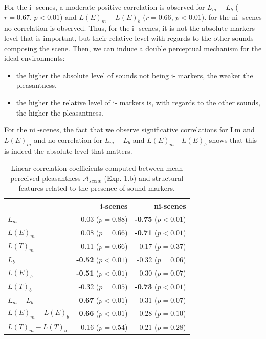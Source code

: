 \documentclass[twoside,twocolumn]{article}
\begin{document}
For the i- scenes, a moderate positive correlation is observed for $L_m-L_b$ ($r=0.67$, $p<0.01$) and $L(E)_m-L(E)_b$ ($r=0.66$, $p<0.01$). for the ni- scenes no correlation is observed. Thus, for the i- scenes, it is not the absolute markers level that is important, but their relative level with regards to the other sounds composing the scene. Then, we can induce a double perceptual mechanism for the ideal environments:

\begin{itemize}
\item the higher the absolute level of sounds not being i- markers, the weaker the pleasantness,
\item the higher the relative level of i- markers is, with regards to the other sounds, the higher the pleasantness.
\end{itemize}

For the ni -scenes, the fact that we observe significative correlations for Lm and $L(E)_m$ and no correlation for $L_m-L_b$ and $L(E)_m$ - $L(E)_b$ shows that this is indeed the absolute level that matters.

\begin{table}[t]
\setlength{\tabcolsep}{3pt}
\centering
{\renewcommand{\arraystretch}{1}
\centering
\begin{tabular}{l r r}
                  &   i-scenes                  & ni-scenes \\
\hline
$L_m$              & 0.03  ($p=0.88$)           & \textbf{-0.75} ($p<0.01$) \\
$L(E)_m$           & 0.08  ($p=0.66$)           & \textbf{-0.71} ($p<0.01$) \\
$L(T)_m$           & -0.11 ($p=0.66$)           & -0.17 ($p=0.37$) \\
$L_b$              & \textbf{-0.52} ($p<0.01$)  & -0.32 ($p=0.06$) \\
$L(E)_b$           & \textbf{-0.51} ($p<0.01$)  & -0.30 ($p=0.07$) \\
$L(T)_b$           & -0.32 ($p=0.05$)           & \textbf{-0.73} ($p<0.01$) \\
$L_m-L_b$          & \textbf{0.67} ($p<0.01$)   & -0.31 ($p=0.07$) \\
$L(E)_m-L(E)_b$    & \textbf{0.66} ($p<0.01$)   & -0.28 ($p=0.10$) \\
$L(T)_m-L(T)_b$    & 0.16 ($p=0.54$)            & 0.21 ($p=0.28$) \\
\hline
\end{tabular}
}
\vspace{0.5mm}
\caption{Linear correlation coefficients computed between mean perceived pleasantness $\mathcal{A}_{scene}$ (Exp. 1.b) and structural features related to the presence of sound markers.}
\label{tab:corrMarkers}
\end{table}
\end{document}
